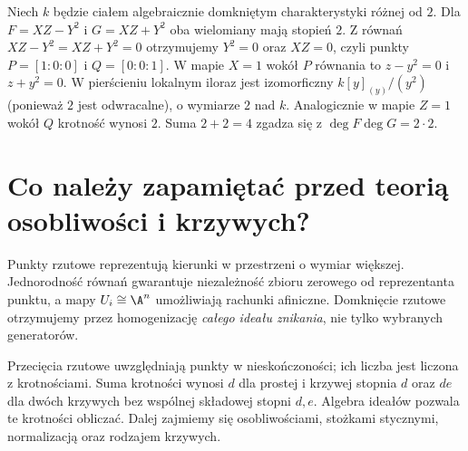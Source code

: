 \begin{przyklad}
Niech $k$ będzie ciałem algebraicznie domkniętym
charakterystyki różnej od $2$. Dla $F=XZ-Y^2$
i $G=XZ+Y^2$ oba wielomiany mają
stopień $2$. Z równań $XZ-Y^2=XZ+Y^2=0$
otrzymujemy $Y^2=0$ oraz $XZ=0$, czyli punkty
$P=[1:0:0]$ i $Q=[0:0:1]$. W mapie $X=1$ wokół $P$
równania to $z-y^2=0$ i $z+y^2=0$.
W pierścieniu lokalnym iloraz jest izomorficzny
$k[y]_{(y)}/(y^2)$ (ponieważ $2$ jest odwracalne),
o wymiarze $2$ nad $k$. Analogicznie w mapie $Z=1$
wokół $Q$ krotność wynosi $2$. Suma $2+2=4$ zgadza się
z $\deg F\deg G=2\cdot2$.
\end{przyklad}

\section{Co należy zapamiętać przed teorią osobliwości i krzywych?}

Punkty rzutowe reprezentują kierunki w przestrzeni o wymiar
większej. Jednorodność równań gwarantuje niezależność zbioru
zerowego od reprezentanta punktu, a mapy
$U_i\cong\A^n$ umożliwiają rachunki afiniczne.
Domknięcie rzutowe otrzymujemy przez homogenizację
\emph{całego ideału znikania}, nie tylko wybranych generatorów.

Przecięcia rzutowe uwzględniają punkty w nieskończoności;
ich liczba jest liczona z krotnościami. Suma krotności wynosi
$d$ dla prostej i krzywej stopnia $d$ oraz $de$ dla dwóch
krzywych bez wspólnej składowej stopni $d,e$.
Algebra ideałów pozwala te krotności obliczać.
Dalej zajmiemy się osobliwościami, stożkami stycznymi,
normalizacją oraz rodzajem krzywych.

